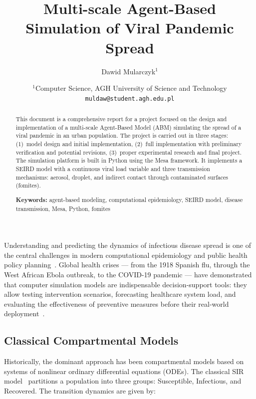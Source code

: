 \documentclass[english]{projectreport}
\author{Dawid Mularczyk$^1$}
\title{Multi-scale Agent-Based Simulation of Viral Pandemic Spread}
\date{
    {\small $^1$Computer Science, AGH University of Science and Technology \\
    \texttt{muldaw@student.agh.edu.pl}\\[2ex]%
    \the\year}
}
\begin{document}
\maketitle
\thispagestyle{empty}

\begin{abstract}
\noindent
This document is a comprehensive report for a project focused on the design
and implementation of a multi-scale Agent-Based Model (ABM) simulating the
spread of a viral pandemic in an urban population. The project is carried out
in three stages: (1)~model design and initial implementation, (2)~full
implementation with preliminary verification and potential revisions,
(3)~proper experimental research and final project. The simulation platform
is built in Python using the Mesa framework. It implements a SEIRD model with
a continuous viral load variable and three transmission mechanisms: aerosol,
droplet, and indirect contact through contaminated surfaces (fomites).

\noindent\textbf{Keywords:} agent-based modeling, computational epidemiology,
SEIRD model, disease transmission, Mesa, Python, fomites
\end{abstract}

\section{\SectionTitleIntroduction}
\label{sec:introduction}

Understanding and predicting the dynamics of infectious disease spread is one
of the central challenges in modern computational epidemiology and public
health policy planning~\cite{anderson1992infectious}. Global health crises ---
from the 1918 Spanish flu, through the West African Ebola outbreak, to the
COVID-19 pandemic --- have demonstrated that computer simulation models are
indispensable decision-support tools: they allow testing intervention
scenarios, forecasting healthcare system load, and evaluating the effectiveness
of preventive measures before their real-world deployment~\cite{tracy2018agent}.

\subsection{Classical Compartmental Models}
\label{sec:compartmental}

Historically, the dominant approach has been compartmental models based on
systems of nonlinear ordinary differential equations (ODEs). The classical
SIR model~\cite{kermack1927sir} partitions a population into three groups:
Susceptible, Infectious, and Recovered. The transition dynamics are given by:
\end{document}
